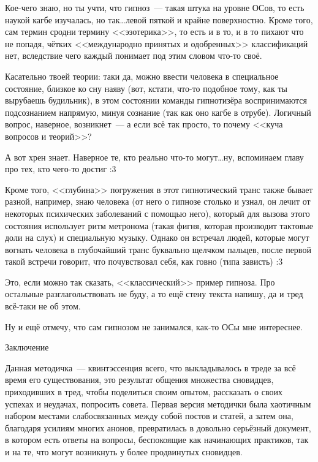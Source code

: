 \documentclass[a4paper,14pt,oneside]{memoir}
\begin{document}
\medskip
Кое-чего знаю, но ты учти, что гипноз~--- такая штука на уровне ОСов, то есть наукой кагбе изучалась, но так\ldots левой пяткой и крайне поверхностно. Кроме того, сам термин сродни термину <<эзотерика>>, то есть и в то, и в то пихают что не попадя, чётких <<международно принятых и одобренных>> классификаций нет, вследствие чего каждый понимает под этим словом что-то своё. 

Касательно твоей теории: таки да, можно ввести человека в специальное состояние, близкое ко сну наяву (вот, кстати, что-то подобное тому, как ты вырубаешь будильник), в этом состоянии команды гипнотизёра воспринимаются подсознанием напрямую, минуя сознание (так как оно кагбе в отрубе). Логичный вопрос, наверное, возникнет~--- а если всё так просто, то почему <<куча вопросов и теорий>>? 

А вот хрен знает. Наверное те, кто реально что-то могут\ldots ну, вспоминаем главу про тех, кто чего-то достиг :3 

Кроме того, <<глубина>> погружения в этот гипнотический транс также бывает разной, например, знаю человека (от него о гипнозе столько и узнал, он лечит от некоторых психических заболеваний с помощью него), который для вызова этого состояния использует ритм метронома (такая фигня, которая производит тактовые доли на слух) и специальную музыку. Однако он встречал людей, которые могут вогнать человека в глубочайший транс буквально щелчком пальцев, после первой такой встречи говорит, что почувствовал себя, как говно (типа зависть) :3 

Это, если можно так сказать, <<классический>> пример гипноза. Про остальные разглагольствовать не буду, а то ещё стену текста напишу, да и тред всё-таки не об этом.

Ну и ещё отмечу, что сам гипнозом не занимался, как-то ОСы мне интереснее.



\clearpage

{\large\textsf{Заключение}}

\bigskip

\thispagestyle{empty}

Данная методичка~--- квинтэссенция всего, что выкладывалось в треде за всё время его существования, это результат общения множества сновидцев, приходивших в тред, чтобы поделиться своим опытом, рассказать о своих успехах и неудачах, попросить совета. Первая версия методички была хаотичным набором местами слабосвязанных между собой постов и статей, а затем она, благодаря усилиям многих анонов, превратилась в довольно серьёзный документ, в котором есть ответы на вопросы, беспокоящие как начинающих практиков, так и на те, что могут возникнуть у более продвинутых сновидцев.
\end{document}
